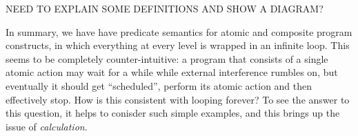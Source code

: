 NEED TO EXPLAIN SOME DEFINITIONS AND SHOW A DIAGRAM?


In summary,
we have have predicate semantics for atomic and composite program
constructs,
in which everything at every level is wrapped in an infinite loop.
This seems to be completely counter-intuitive:
a program that consists of a single atomic action may wait
for a while while external interference rumbles on,
but eventually it should get ``scheduled'', perform its atomic action
and then effectively stop.
How is this consistent with looping forever?
To see the answer to this question,
it helps to conisder such simple examples,
and this brings up the issue of \emph{calculation}.
